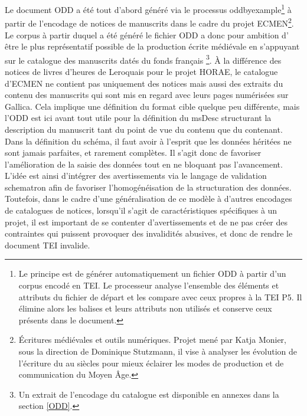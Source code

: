 \documentclass[a4paper,12pt,twoside]{book}
\begin{document}
	Le document ODD a été tout d'abord généré via le processus oddbyexample\footnote{Le principe est de générer automatiquement un fichier ODD à partir d'un corpus encodé en TEI. Le processeur analyse l'ensemble des éléments et attributs du fichier de départ et les compare avec ceux propres à la TEI P5. Il élimine alors les balises et leurs attributs non utilisés et conserve ceux présents dans le document.} à partir de l'encodage de notices de manuscrits dans le cadre du projet ECMEN\footnote{Écritures médiévales et outils numériques. Projet mené par Katja Monier, sous la direction de Dominique Stutzmann, il vise à analyser les évolution de l'écriture du  au  siècles pour mieux éclairer les modes de production et de communication du Moyen Âge.}. Le corpus à partir duquel a été généré le fichier ODD a donc pour ambition d' être le plus représentatif possible de la production écrite médiévale en s'appuyant sur le catalogue des manuscrits datés du fonds français \footnote{Un extrait de l'encodage du catalogue est disponible en annexes dans la section \ref{ODD}.}. À la différence des notices de livres d'heures de Leroquais pour le projet HORAE, le catalogue d'ECMEN ne contient pas uniquement des notices mais aussi des extraits du contenu des manuscrits qui sont mis en regard avec leurs pages numérisées sur Gallica. Cela implique une définition du format cible quelque peu différente, mais l'ODD est ici avant tout utile pour la définition du msDesc structurant la description du manuscrit tant du point de vue du contenu que du contenant. \\
	
	Dans la définition du schéma, il faut avoir à l'esprit que les données héritées ne sont jamais parfaites, et rarement complètes. Il s'agit donc de favoriser l'amélioration de la saisie des données tout en ne bloquant pas l'avancement. L'idée est ainsi d'intégrer des avertissements via le langage de validation schematron afin de favoriser l'homogénéisation de la structuration des données. Toutefois, dans le cadre d'une généralisation de ce modèle à d'autres encodages de catalogues de notices, lorsqu'il s'agit de caractéristiques spécifiques à un projet, il est important de se contenter d'avertissements et de ne pas créer des contraintes qui puissent provoquer des invalidités abusives, et donc de rendre le document TEI invalide.
	
\end{document}
